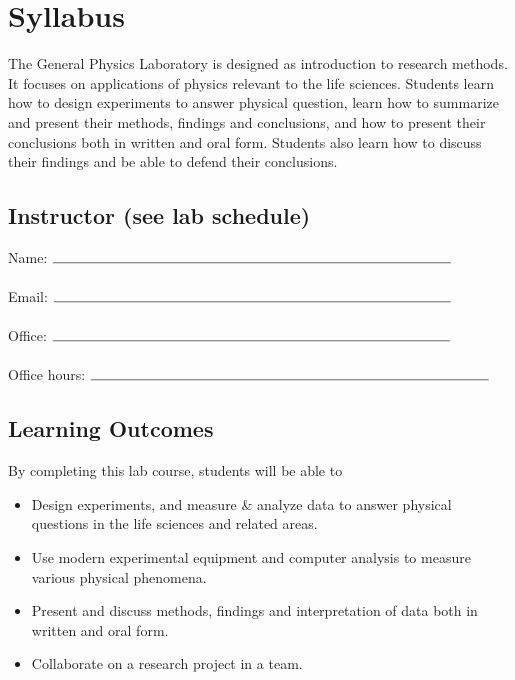\clearpage
\setcounter{page}{1}

\chapter*{Syllabus}
\thispagestyle{fancy}
The General Physics Laboratory is designed as introduction to research methods.
It focuses on applications of physics relevant to the life sciences.
Students learn how to design experiments to answer physical question, learn how to summarize and present their methods, findings and conclusions, and how to present their conclusions both in written and oral form.
Students also learn how to discuss their findings and be able to defend their conclusions.

\section*{Instructor {\small (see lab schedule)}}
Name: $\rule{10cm}{0.15mm}$ \\
\medskip \\ 
Email: $\rule{10cm}{0.15mm}$ \\
\medskip \\
Office: $\rule{10cm}{0.15mm}$ \\
\medskip \\
Office hours: $\rule{10cm}{0.15mm}$

\section*{Learning Outcomes}
By completing this lab course, students will be able to
\begin{itemize}
\item Design experiments, and measure \& analyze data to answer physical questions in the life sciences and related areas.
\item Use modern experimental equipment and computer analysis to measure various physical phenomena.
\item Present and discuss methods, findings and interpretation of data both in written and oral form.
\item Collaborate on a research project in a team.
\end{itemize}

\newpage

